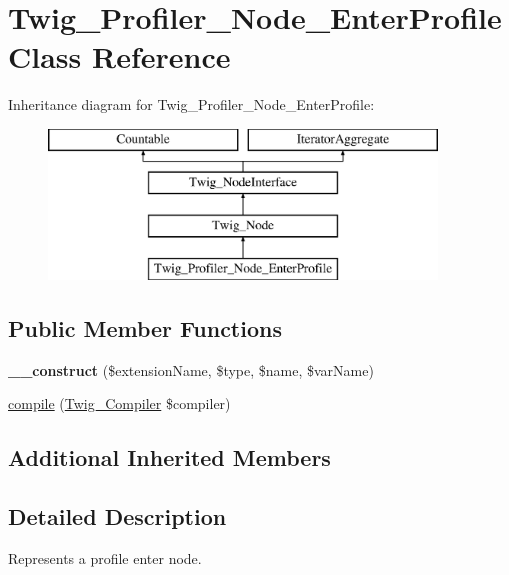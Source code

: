 \hypertarget{class_twig___profiler___node___enter_profile}{}\section{Twig\+\_\+\+Profiler\+\_\+\+Node\+\_\+\+Enter\+Profile Class Reference}
\label{class_twig___profiler___node___enter_profile}
Inheritance diagram for Twig\+\_\+\+Profiler\+\_\+\+Node\+\_\+\+Enter\+Profile\+:\begin{figure}[H]
\begin{center}
\leavevmode
\includegraphics[height=4.000000cm]{class_twig___profiler___node___enter_profile}
\end{center}
\end{figure}
\subsection*{Public Member Functions}
\begin{DoxyCompactItemize}
\item 
\hypertarget{class_twig___profiler___node___enter_profile_ad414eb2ba504d225f3290a4c48a6a149}{}{\bfseries \+\_\+\+\_\+construct} (\$extension\+Name, \$type, \$name, \$var\+Name)\label{class_twig___profiler___node___enter_profile_ad414eb2ba504d225f3290a4c48a6a149}

\item 
\hyperlink{class_twig___profiler___node___enter_profile_a4e0faa87c3fae583620b84d3607085da}{compile} (\hyperlink{class_twig___compiler}{Twig\+\_\+\+Compiler} \$compiler)
\end{DoxyCompactItemize}
\subsection*{Additional Inherited Members}


\subsection{Detailed Description}
Represents a profile enter node.

